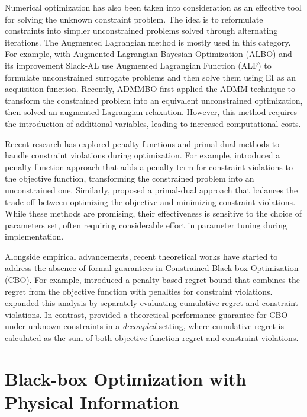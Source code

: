 Numerical optimization has also been taken into consideration as an effective tool for solving the unknown constraint problem. The idea is to reformulate constraints into simpler unconstrained problems solved through alternating iterations. The Augmented Lagrangian method is mostly used in this category. For example, \citet{gramacy2016modeling} with Augmented Lagrangian Bayesian Optimization (ALBO) and its improvement Slack-AL \citep{picheny2016bayesian} use Augmented Lagrangian Function (ALF) to formulate unconstrained surrogate problems and then solve them using EI as an acquisition function. Recently, ADMMBO \citep{ariafar2019admmbo} first applied the ADMM technique to transform the constrained problem into an equivalent unconstrained optimization, then solved an augmented Lagrangian relaxation. However, this method requires the introduction of additional variables, leading to increased computational costs.

Recent research has explored penalty functions and primal-dual methods to handle constraint violations during optimization. For example, \citet{lu2022no} introduced a penalty-function approach that adds a penalty term for constraint violations to the objective function, transforming the constrained problem into an unconstrained one. Similarly, \citep{zhou2022kernelized} proposed a primal-dual approach that balances the trade-off between optimizing the objective and minimizing constraint violations. While these methods are promising, their effectiveness is sensitive to the choice of parameters set, often requiring considerable effort in parameter tuning during implementation.

Alongside empirical advancements, recent theoretical works have started to address the absence of formal guarantees in Constrained Black-box Optimization (CBO). For example, \citet{lu2022no} introduced a penalty-based regret bound that combines the regret from the objective function with penalties for constraint violations. \citet{xu2023constrained} expanded this analysis by separately evaluating cumulative regret and constraint violations. In contrast, \citet{nguyen2023optimistic} provided a theoretical performance guarantee for CBO under unknown constraints in a \textit{decoupled} setting, where cumulative regret is calculated as the sum of both objective function regret and constraint violations.
\section{Black-box Optimization with Physical Information}
\label{section:bo_physics}

